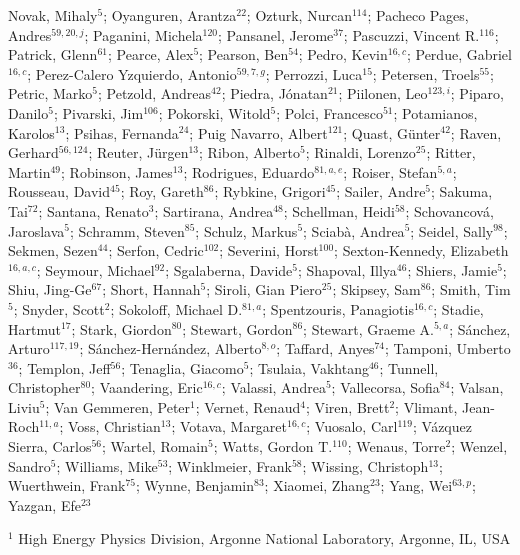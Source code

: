 Novak, Mihaly$^{5}$;
Oyanguren, Arantza$^{22}$;
Ozturk, Nurcan$^{114}$;
Pacheco Pages, Andres$^{59,20,j}$;
Paganini, Michela$^{120}$;
Pansanel, Jerome$^{37}$;
Pascuzzi, Vincent R.$^{116}$;
Patrick, Glenn$^{61}$;
Pearce, Alex$^{5}$;
Pearson, Ben$^{54}$;
Pedro, Kevin$^{16,c}$;
Perdue, Gabriel$^{16,c}$;
Perez-Calero Yzquierdo, Antonio$^{59,7,g}$;
Perrozzi, Luca$^{15}$;
Petersen, Troels$^{55}$;
Petric, Marko$^{5}$;
Petzold, Andreas$^{42}$;
Piedra, Jónatan$^{21}$;
Piilonen, Leo$^{123,i}$;
Piparo, Danilo$^{5}$;
Pivarski, Jim$^{106}$;
Pokorski, Witold$^{5}$;
Polci, Francesco$^{51}$;
Potamianos, Karolos$^{13}$;
Psihas, Fernanda$^{24}$;
Puig Navarro, Albert$^{121}$;
Quast, Günter$^{42}$;
Raven, Gerhard$^{56,124}$;
Reuter, Jürgen$^{13}$;
Ribon, Alberto$^{5}$;
Rinaldi, Lorenzo$^{25}$;
Ritter, Martin$^{49}$;
Robinson, James$^{13}$;
Rodrigues, Eduardo$^{81,a,e}$;
Roiser, Stefan$^{5,a}$;
Rousseau, David$^{45}$;
Roy, Gareth$^{86}$;
Rybkine, Grigori$^{45}$;
Sailer, Andre$^{5}$;
Sakuma, Tai$^{72}$;
Santana, Renato$^{3}$;
Sartirana, Andrea$^{48}$;
Schellman, Heidi$^{58}$;
Schovancová, Jaroslava$^{5}$;
Schramm, Steven$^{85}$;
Schulz, Markus$^{5}$;
Sciabà, Andrea$^{5}$;
Seidel, Sally$^{98}$;
Sekmen, Sezen$^{44}$;
Serfon, Cedric$^{102}$;
Severini, Horst$^{100}$;
Sexton-Kennedy, Elizabeth$^{16,a,c}$;
Seymour, Michael$^{92}$;
Sgalaberna, Davide$^{5}$;
Shapoval, Illya$^{46}$;
Shiers, Jamie$^{5}$;
Shiu, Jing-Ge$^{67}$;
Short, Hannah$^{5}$;
Siroli, Gian Piero$^{25}$;
Skipsey, Sam$^{86}$;
Smith, Tim$^{5}$;
Snyder, Scott$^{2}$;
Sokoloff, Michael D.$^{81,a}$;
Spentzouris, Panagiotis$^{16,c}$;
Stadie, Hartmut$^{17}$;
Stark, Giordon$^{80}$;
Stewart, Gordon$^{86}$;
Stewart, Graeme A.$^{5,a}$;
Sánchez, Arturo$^{117,19}$;
Sánchez-Hernández, Alberto$^{8,o}$;
Taffard, Anyes$^{74}$;
Tamponi, Umberto$^{36}$;
Templon, Jeff$^{56}$;
Tenaglia, Giacomo$^{5}$;
Tsulaia, Vakhtang$^{46}$;
Tunnell, Christopher$^{80}$;
Vaandering, Eric$^{16,c}$;
Valassi, Andrea$^{5}$;
Vallecorsa, Sofia$^{84}$;
Valsan, Liviu$^{5}$;
Van Gemmeren, Peter$^{1}$;
Vernet, Renaud$^{4}$;
Viren, Brett$^{2}$;
Vlimant, Jean-Roch$^{11,a}$;
Voss, Christian$^{13}$;
Votava, Margaret$^{16,c}$;
Vuosalo, Carl$^{119}$;
Vázquez Sierra, Carlos$^{56}$;
Wartel, Romain$^{5}$;
Watts, Gordon T.$^{110}$;
Wenaus, Torre$^{2}$;
Wenzel, Sandro$^{5}$;
Williams, Mike$^{53}$;
Winklmeier, Frank$^{58}$;
Wissing, Christoph$^{13}$;
Wuerthwein, Frank$^{75}$;
Wynne, Benjamin$^{83}$;
Xiaomei, Zhang$^{23}$;
Yang, Wei$^{63,p}$;
Yazgan, Efe$^{23}$
\bigskip
\par {\footnotesize $^{1}$ High Energy Physics Division, Argonne National Laboratory, Argonne, IL, USA}
